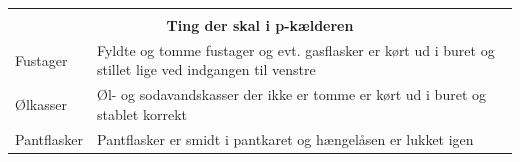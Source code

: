 \documentclass[a4paper,10pt,oneside,article]{memoir}
\begin{document}
\vspace{0.5cm}
\noindent
\begin{tabular}{|l|l|}
    \hline
    \multicolumn{2}{|c|}{} \\
    \multicolumn{2}{|c|}{\Large \textbf{Ting der skal i p-kælderen}} \\
    \hline
    \begin{minipage}[t]{0.15\textwidth}
        Fustager
    \end{minipage} & 
    \begin{minipage}[t]{0.80\textwidth}
        Fyldte og tomme fustager og evt. gasflasker er kørt ud i buret og 
        stillet lige ved indgangen til venstre
    \end{minipage} \\
    \hline
    \begin{minipage}[t]{0.15\textwidth}
        Ølkasser
    \end{minipage} & 
    \begin{minipage}[t]{0.80\textwidth}
        Øl- og sodavandskasser der ikke er tomme er kørt ud i buret og stablet korrekt
    \end{minipage} \\
    \hline
    \begin{minipage}[t]{0.15\textwidth}
        Pantflasker
    \end{minipage} & 
    \begin{minipage}[t]{0.80\textwidth}
        Pantflasker er smidt i pantkaret og hængelåsen er lukket igen
    \end{minipage} \\
    \hline
\end{tabular}
\end{document}
